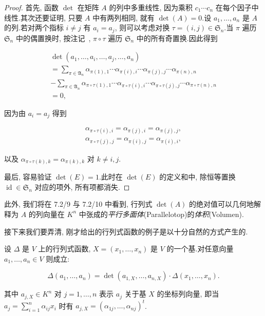 \begin{proof}
首先, 函数 $\det$ 在矩阵 $A$ 的列中多重线性, 因为乘积 $c_1 \cdots c_n$ 在每个因子中线性.其次还要证明, 只要 $A$ 中有两列相同, 就有 $\det(A) = 0$.设 $a_1, \ldots, a_n$ 是 $A$ 的列.若对两个指标 $i \neq j$ 有 $a_i = a_j$, 则可以考虑对换 $\tau = (i, j) \in \mathfrak{S}_n$.当 $\pi$ 遍历 $\mathfrak{S}_n$ 中的偶置换时, 按注记~, $\pi \circ \tau$ 遍历 $\mathfrak{S}_n$ 中的所有奇置换.因此得到

\[
\begin{array}{l}
\det(a_1, \ldots, a_i, \ldots, a_j, \ldots, a_n) \\
= \sum_{\pi \in \mathfrak{A}_n} \alpha_{\pi(1), 1} \cdots \alpha_{\pi(i), i} \cdots \alpha_{\pi(j), j} \cdots \alpha_{\pi(n), n} \\
- \sum_{\pi \in \mathfrak{A}_n} \alpha_{\pi \circ \tau(1), 1} \cdots \alpha_{\pi \circ \tau(i), i} \cdots \alpha_{\pi \circ \tau(j), j} \cdots \alpha_{\pi \circ \tau(n), n} \\
= 0,
\end{array}
\]

因为由 $a_i = a_j$ 得到

\[
\begin{array}{c}
\alpha_{\pi \circ \tau(i), i} = \alpha_{\pi(j), i} = \alpha_{\pi(j), j}, \\
\alpha_{\pi \circ \tau(j), j} = \alpha_{\pi(i), j} = \alpha_{\pi(i), i},
\end{array}
\]

以及 $\alpha_{\pi \circ \tau(k), k} = \alpha_{\pi(k), k}$ 对 $k \neq i, j$.

最后, 容易验证 $\det(E) = 1$.此时在 $\det(E)$ 的定义和中, 除恒等置换 $\operatorname{id} \in \mathfrak{S}_n$ 对应的项外, 所有项都消失.
\end{proof}

此外, 我们将在 7.2/9 与 7.2/10 中看到, 行列式 $\det(A)$ 的绝对值可以几何地解释为 $A$ 的列向量在 $K^n$ 中张成的\emph{平行多面体}(\textup{Parallelotop})的\emph{体积}(\textup{Volumen}).

接下来我们要弄清, 刚才给出的行列式函数的例子是以十分自然的方式产生的.

\begin{lemma}\label{lem:4.2.5}
设 $\varDelta$ 是 $V$ 上的行列式函数, $X = (x_1, \ldots, x_n)$ 是 $V$ 的一个基.对任意向量 $a_1, \ldots, a_n \in V$ 则成立:

\[
\varDelta(a_1, \ldots, a_n) = \det(a_{1, X}, \ldots, a_{n, X}) \cdot \varDelta(x_1, \ldots, x_n).
\]

其中 $a_{j, X} \in K^n$ 对 $j = 1, \ldots, n$ 表示 $a_j$ 关于基 $X$ 的坐标列向量, 即当 $a_j = \sum_{i = 1}^{n} \alpha_{ij} x_i$ 时有 $a_{j, X} = (\alpha_{1j}, \ldots, \alpha_{nj})^t$.
\end{lemma}

